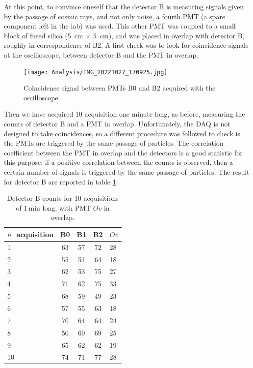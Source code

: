 At this point, to convince oneself that the detector B is measuring signals given by the passage of cosmic rays, and not only noise, a fourth PMT (a spare component left in the lab) was used. This other PMT was coupled to a small block of fused silica (\SI{5}{\centi \meter} $\times$ \SI{5}{\centi \meter}), and was placed in overlap with detector B, roughly in correspondence of B2. A first check was to look for coincidence signals at the oscilloscope, between detector B and the PMT in overlap.

\begin{figure}[!ht]
\centering
\texttt{[image: Analysis/IMG\_20221027\_170925.jpg]} 
\caption{Coincidence signal between PMTs B0 and B2 acquired with the oscilloscope.}
\label{fig:CoincidenceSignal}
\end{figure}

Then we have acquired 10 acquisition one minute long, as before, measuring the counts of detector B and a PMT in overlap. Unfortunately, the DAQ is not designed to take coincidences, so a different procedure was followed to check is the PMTs are triggered by the same passage of particles. 
The correlation coefficient between the PMT in overlap and the detectors is a good statistic for this purpose: if a positive correlation between the counts is observed, then a certain number of signals is triggered by the same passage of particles. The result for detector B are reported in table \ref{tab:OverlapB}:

\begin{table}[ht]
\centering
\begin{tabular}{lcccl}
\hline 
$n^{\circ}$ acquisition  & B0 & B1 & B2 & $Ov$ \\ 
\hline 
1 & 63 & 57 & 72 & 28 \\ 
 
2 & 55 & 51 & 64 & 18 \\ 
 
3 & 62 & 53 & 75 & 27 \\ 
 
4 & 71 & 62 & 75 & 33 \\ 
 
5 & 68 & 59 & 49 & 23 \\ 
 
6 & 57 & 55 & 63 & 18 \\ 
 
7 & 70 & 64 & 64 & 24 \\ 
 
8 & 50 & 69 & 69 & 25 \\ 
 
9 & 65 & 62 & 62 & 19 \\ 
 
10 & 74 & 71 & 77 & 28 \\ 
\hline
\end{tabular} 
\caption{Detector B counts for 10 acquisitions of $\SI{1}{\minute}$ long, with PMT $Ov$ in overlap.}
\label{tab:OverlapB}
\end{table} 


